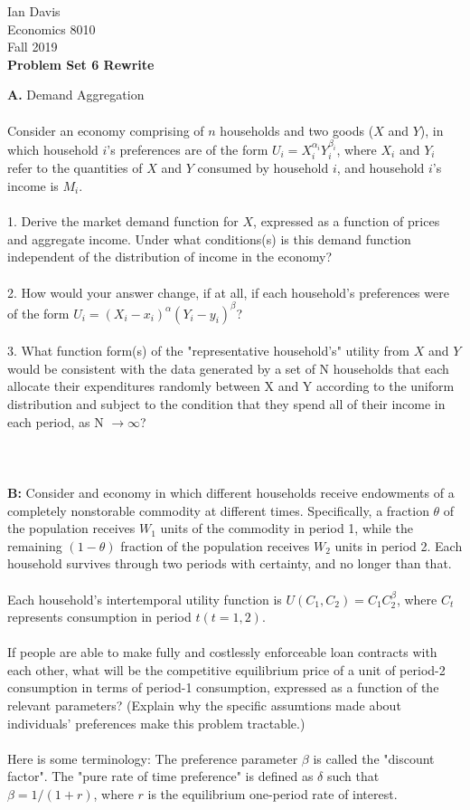 \documentclass[11pt]{article}
\begin{document}
\begin{flushleft}
Ian Davis\\
Economics 8010\\
Fall 2019\\
\bigskip
\textbf{Problem Set 6 Rewrite}\\
\end{flushleft}
\textbf{A. } Demand Aggregation\\
\\
Consider an economy comprising of $n$ households and two goods ($X$ and $Y$), in which household $i$'s preferences are of the form $U_i=X_i^{\alpha_i} Y_i^{\beta_i}$, where $X_i$ and $Y_i$ refer to the quantities of $X$ and $Y$ consumed by household $i$, and household $i$'s income is $M_i$.\\
\\
1. Derive the market demand function for $X$, expressed as a function of prices and aggregate income. Under what conditions(s) is this demand function independent of the distribution of income in the economy?\\
\\
2. How would your answer change, if at all, if each household's preferences were of the form $U_i = (X_i-x_i)^\alpha (Y_i-y_i)^\beta$?\\
\\
3. What function form(s) of the "representative household's" utility from $X$ and $Y$ would be consistent with the data generated by a set of N households that each allocate their expenditures randomly between X and Y according to the uniform distribution and subject to the condition that they spend all of their income in each period, as N $\rightarrow \infty$?\\
\\
\\
\\
\textbf{B: }Consider and economy in which different households receive endowments of a completely nonstorable commodity at different times. Specifically, a fraction $\theta$ of the population receives $W_1$ units of the commodity in period 1, while the remaining $(1-\theta)$ fraction of the population receives $W_2$ units in period 2. Each household survives through two periods with certainty, and no longer than that.\\
\\
Each household's intertemporal utility function is $U(C_1,C_2) = C_1C_2^\beta$, where $C_t$ represents consumption in period $t (t=1,2)$.\\
\\
If people are able to make fully and costlessly enforceable loan contracts with each other, what will be the competitive equilibrium price of a unit of period-2 consumption in terms of period-1 consumption, expressed as a function of the relevant parameters? (Explain why the specific assumtions made about individuals' preferences make this problem tractable.)\\
\\
Here is some terminology: The preference parameter $\beta$ is called the "discount factor". The "pure rate of time preference" is defined as $\delta$ such that $\beta = 1/(1 + r)$, where $r$ is the equilibrium one-period rate of interest.\\
\end{document}
